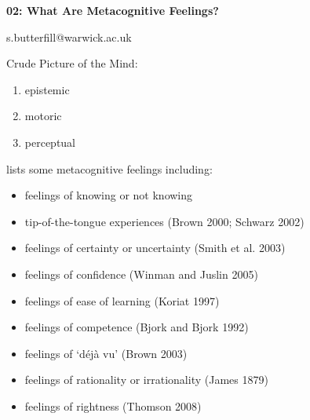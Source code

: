 \documentclass[12pt]{extarticle}
\date{}
\makeatletter
\def \ititle {Philosophical Psychology}
\def \iemail{s.butterfill@warwick.ac.uk}
\makeatother
\begin{document}
\begin{multicols*}{3}

\setlength\footnotesep{1em}










\def \ititle {02: What Are Metacognitive Feelings?}

\begin{center}

{\Large

\textbf{\ititle}

}



\iemail %

\end{center}


Crude Picture of the Mind:
\begin{enumerate}
  \item epistemic
  \item motoric
  \item perceptual
\end{enumerate}

\citet[p.~302]{dokic:2012_seeds} lists some metacognitive feelings including:
\begin{itemize}
\item feelings of knowing or not knowing \citep{koriat:2000_feeling}
\item tip-of-the-tongue experiences (Brown 2000; Schwarz 2002)
\item feelings of certainty or uncertainty (Smith et al. 2003)
\item feelings of confidence (Winman and Juslin 2005)
\item feelings of ease of learning (Koriat 1997)
\item feelings of competence (Bjork and Bjork 1992)
\item feelings of ‘déjà vu’ (Brown 2003)
\item feelings of rationality or irrationality (James 1879)
\item feelings of rightness (Thomson 2008)
\end{itemize}


\end{multicols*}
\end{document}
